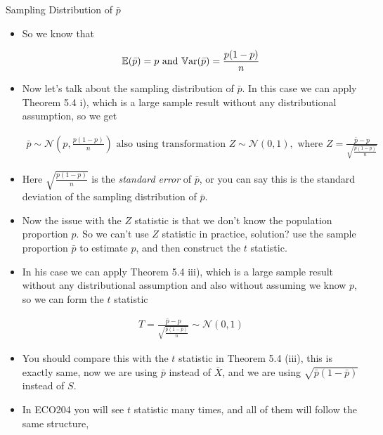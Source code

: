 \documentclass[8pt, usepdftitle=false]{beamer}
\begin{document}
\begin{frame}[allowframebreaks]{Sampling Distribution of $\bar{p}$}
\begin{itemize}
    \item So we know that 

    \begin{align*}
      \mathbb{E}(\bar{p}) = p \text{ and } \mathbb{V}\mathrm{ar}{(}\bar{p}) = \frac{p(1-p)}{n}
    \end{align*}

    \item Now let's talk about the sampling distribution of $\bar{p}$. In this case we can apply Theorem 5.4 i), which is a large sample result without any distributional assumption, so we get


    \begin{align*}
           \bar{p} \sim \mathcal{N}\left(p, \frac{p(1-p)}{n}\right) \text{ also using transformation } Z \sim \mathcal{N}(0, 1), \text{ where } Z = \frac{\bar{p} - p}{\sqrt{\frac{p(1-p)}{n}}}
    \end{align*}

    \item Here $\sqrt{\frac{p(1-p)}{n}}$ is the \emph{standard error} of $\bar{p}$, or you can say this is the standard deviation of the sampling distribution of $\bar{p}$.


    \framebreak

    \item Now the issue with the $Z$ statistic is that we don't know the population proportion $p$. So we can't use $Z$ statistic in practice, solution? use the sample proportion $\bar{p}$ to estimate $p$, and then construct the $t$ statistic. 

    \item In his case we can apply Theorem 5.4 iii), which is a large sample result without any distributional assumption and also without assuming we know $p$, so we can form the $t$ statistic


    \begin{align*}
      T =  \frac{\bar{p} - p}{\sqrt{\frac{\bar{p}(1-\bar{p})}{n}}} \sim \mathcal{N}(0, 1)
    \end{align*}

    \item You should compare this with the $t$ statistic in Theorem 5.4 (iii), this is exactly same, now we are using $\bar{p}$ instead of $\bar{X}$, and we are using $\sqrt{\bar{p}(1-\bar{p})}$ instead of $S$.


    \item In ECO204 you will see $t$ statistic many times, and all of them will follow the same structure, 


\end{itemize}
\end{frame}
\end{document}
